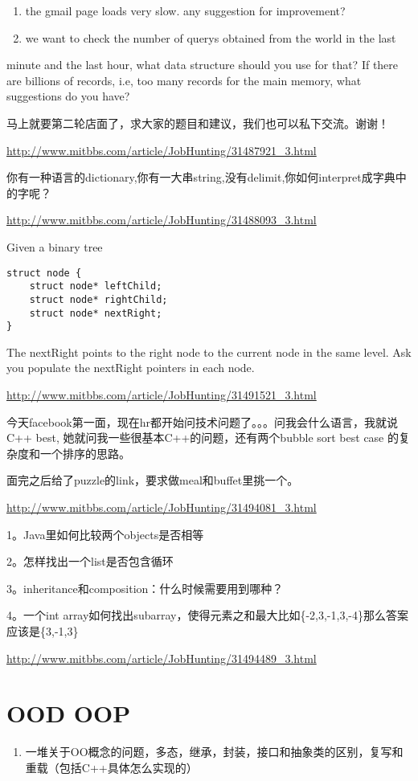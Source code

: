 \documentclass[12pt]{book}
\begin{document}
\begin{enumerate}
\item the gmail page loads very slow. any suggestion for improvement?

\item we want to check the number of querys obtained from the world in the last
\end{enumerate}
minute and the last hour, what data structure should you use for that? If 
there are billions of records, i.e, too many records for the main memory, 
what suggestions do you have?

马上就要第二轮店面了，求大家的题目和建议，我们也可以私下交流。谢谢！

\url{http://www.mitbbs.com/article/JobHunting/31487921_3.html}

你有一种语言的dictionary,你有一大串string,没有delimit,你如何interpret成字典中的字呢？

\url{http://www.mitbbs.com/article/JobHunting/31488093_3.html}

Given a binary tree
\lstset{language=java,label= ,caption= ,numbers=none}
\begin{lstlisting}
struct node {
    struct node* leftChild;
    struct node* rightChild;
    struct node* nextRight;
}
\end{lstlisting}
The nextRight points to the right node to the current node in the same level. Ask you populate the nextRight pointers in each node.

\url{http://www.mitbbs.com/article/JobHunting/31491521_3.html}

今天facebook第一面，现在hr都开始问技术问题了。。。问我会什么语言，我就说C++ best, 她就问我一些很基本C++的问题，还有两个bubble sort best case 的复杂度和一个排序的思路。 

面完之后给了puzzle的link，要求做meal和buffet里挑一个。 

\url{http://www.mitbbs.com/article/JobHunting/31494081_3.html}

1。Java里如何比较两个objects是否相等

2。怎样找出一个list是否包含循环 

3。inheritance和composition：什么时候需要用到哪种？

4。一个int array如何找出subarray，使得元素之和最大比如\{-2,3,-1,3,-4\}那么答案应该是\{3,-1,3\}

\url{http://www.mitbbs.com/article/JobHunting/31494489_3.html}

\chapter{OOD OOP}
\label{sec-20}
\begin{enumerate}
\item 一堆关于OO概念的问题，多态，继承，封装，接口和抽象类的区别，复写和重载（包括C++具体怎么实现的）
\end{enumerate}
\end{document}
